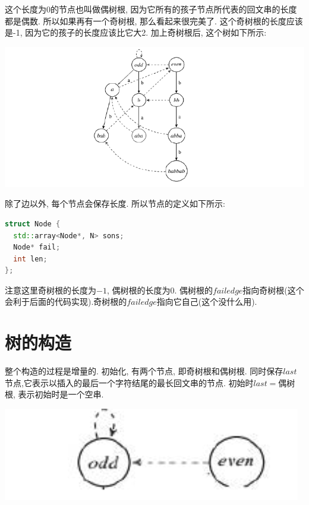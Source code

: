 \documentclass{article}
\begin{document}
这个长度为0的节点也叫做偶树根, 因为它所有的孩子节点所代表的回文串的长度都是偶数. 所以如果再有一个奇树根, 那么看起来很完美了. 这个奇树根的长度应该是-1, 因为它的孩子的长度应该比它大2. 加上奇树根后, 这个树如下所示:\par

\includegraphics[scale=0.6]{pic3.png} \par

除了边以外, 每个节点会保存长度. 所以节点的定义如下所示:\par
\begin{lstlisting}[language=C++, caption={Node Definition}]
struct Node {
  std::array<Node*, N> sons;
  Node* fail;
  int len;
};
\end{lstlisting}
注意这里奇树根的长度为$-1$, 偶树根的长度为0. 偶树根的$failedge$指向奇树根(这个会利于后面的代码实现).奇树根的$failedge$指向它自己(这个没什么用).

\section{树的构造}
整个构造的过程是增量的.
初始化, 有两个节点, 即奇树根和偶树根. 同时保存$last$节点,它表示以插入的最后一个字符结尾的最长回文串的节点. 初始时$last=$偶树根, 表示初始时是一个空串. \par
\includegraphics[scale=0.4]{pic4.png} \par
\end{document}
